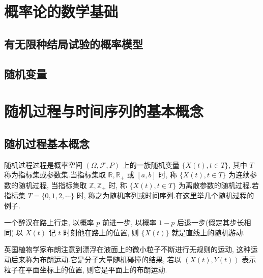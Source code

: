 \documentclass[cn,toc=twocol]{elegantbook}
\newcommand{\R}{\mathbb{R}}
\newcommand{\Z}{\mathbb{Z}}
\begin{document}

\chapter{概率论的数学基础}

\section{有无限种结局试验的概率模型}

\section{随机变量}





\chapter{随机过程与时间序列的基本概念}

\section{随机过程基本概念}

随机过程过程是概率空间 $(\Omega, \mathcal{F}, P)$ 上的一族随机变量 $\{X(t), t\in T\}$, 其中 $T$ 称为指标集或参数集.当指标集取 $\R, \R_+$ 或 $[a, b]$ 时, 称 $\{X(t), t\in T\}$ 为连续参数的随机过程, 当指标集取 $\Z, \Z_+$ 时, 称 $\{X(t), t\in T\}$ 为离散参数的随机过程.若指标集 $T = \{0, 1, 2, \cdots\}$ 时, 称之为随机序列或时间序列.在这里举几个随机过程的例子.
\begin{example}[随机游动]
	一个醉汉在路上行走, 以概率 $p$ 前进一步, 以概率 $1-p$ 后退一步(假定其步长相同).以 $X(t)$ 记 $t$ 时刻他在路上的位置, 则 $\{X(t)\}$ 就是直线上的随机游动.
\end{example}

\begin{example}[布朗运动]
	英国植物学家布朗注意到漂浮在液面上的微小粒子不断进行无规则的运动, 这种运动后来称为布朗运动.它是分子大量随机碰撞的结果, 若以 $(X(t), Y(t))$ 表示粒子在平面坐标上的位置, 则它是平面上的布朗运动.
\end{example}
\end{document}
